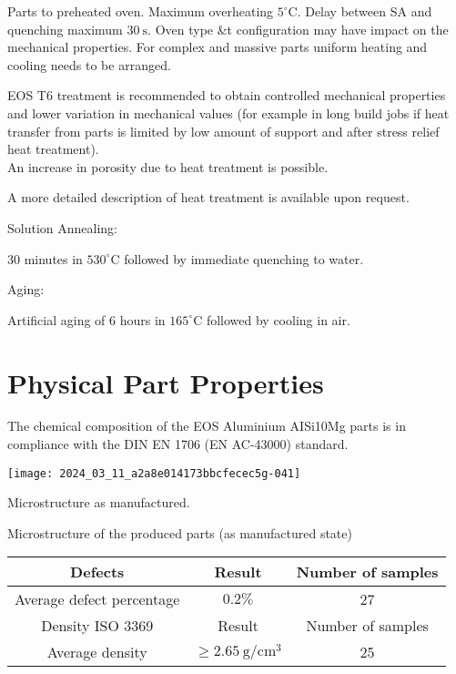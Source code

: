 \documentclass[10pt]{article}
\begin{document}
Parts to preheated oven. Maximum overheating $5^{\circ} \mathrm{C}$. Delay between SA and quenching maximum $30 \mathrm{~s}$. Oven type \&t configuration may have impact on the mechanical properties. For complex and massive parts uniform heating and cooling needs to be arranged.

EOS T6 treatment is recommended to obtain controlled mechanical properties and lower variation in mechanical values (for example in long build jobs if heat transfer from parts is limited by low amount of support and after stress relief heat treatment).\\
An increase in porosity due to heat treatment is possible.

A more detailed description of heat treatment is available upon request.

Solution Annealing:

30 minutes in $530^{\circ} \mathrm{C}$ followed by immediate quenching to water.

Aging:

Artificial aging of 6 hours in $165^{\circ} \mathrm{C}$ followed by cooling in air.

\section*{Physical Part Properties}
The chemical composition of the EOS Aluminium AISi10Mg parts is in compliance with the DIN EN 1706 (EN AC-43000) standard.

\begin{center}
\texttt{[image: 2024\_03\_11\_a2a8e014173bbcfecec5g-041]}
\end{center}

Microstructure as manufactured.

Microstructure of the produced parts (as manufactured state)

\begin{center}
\begin{tabular}{|c|c|c|}
\hline
Defects & Result & Number of samples \\
\hline
Average defect percentage & $0.2 \%$ & 27 \\
\hline
Density ISO 3369 & Result & Number of samples \\
\hline
Average density & $\geq 2.65 \mathrm{~g} / \mathrm{cm}^{3}$ & 25 \\
\hline
\end{tabular}
\end{center}
\end{document}
